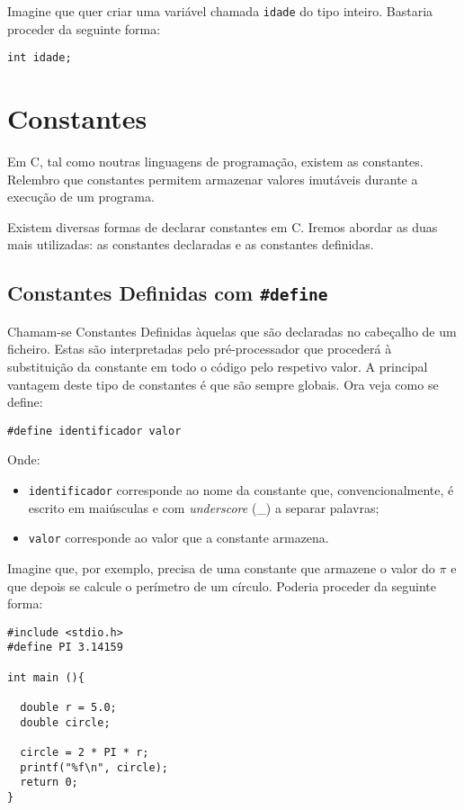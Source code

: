 Imagine que quer criar uma variável chamada \texttt{idade} do tipo inteiro. Bastaria proceder da seguinte forma:

\begin{lstlisting}
int idade;
\end{lstlisting}

\section{Constantes}

Em C, tal como noutras linguagens de programação, existem as constantes. Relembro que constantes permitem armazenar valores imutáveis durante a execução de um programa.

Existem diversas formas de declarar constantes em C. Iremos abordar as duas mais utilizadas: as constantes declaradas e as constantes definidas.

\subsection{Constantes Definidas com \texttt{\#define}}

Chamam-se Constantes Definidas àquelas que são declaradas no cabeçalho de um ficheiro. Estas são interpretadas pelo pré-processador que procederá à substituição da constante em todo o código pelo respetivo valor. A principal vantagem deste tipo de constantes é que são sempre globais. Ora veja como se define:

\begin{lstlisting}
#define identificador valor
\end{lstlisting}

Onde:

\begin{itemize}
\item \texttt{identificador} corresponde ao nome da constante que, convencionalmente, é escrito em maiúsculas e com \textit{underscore} (\_) a separar palavras;
\item \texttt{valor} corresponde ao valor que a constante armazena.
\end{itemize}

Imagine que, por exemplo, precisa de uma constante que armazene o valor do $\pi$ e que depois se calcule o perímetro de um círculo. Poderia proceder da seguinte forma:

\begin{lstlisting}
#include <stdio.h>
#define PI 3.14159
 
int main (){
 
  double r = 5.0;              
  double circle;
 
  circle = 2 * PI * r;      
  printf("%f\n", circle);
  return 0;
}
\end{lstlisting}


